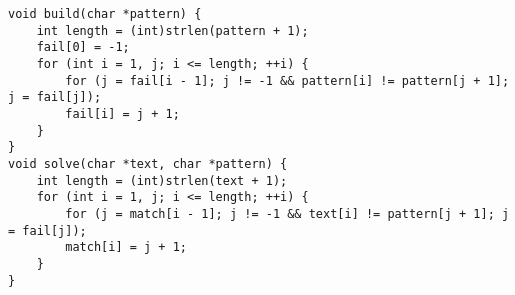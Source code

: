 \begin{lstlisting}
void build(char *pattern) {
    int length = (int)strlen(pattern + 1);
    fail[0] = -1;
    for (int i = 1, j; i <= length; ++i) {
        for (j = fail[i - 1]; j != -1 && pattern[i] != pattern[j + 1]; j = fail[j]);
        fail[i] = j + 1;
    }
}
void solve(char *text, char *pattern) {
    int length = (int)strlen(text + 1);
    for (int i = 1, j; i <= length; ++i) {
        for (j = match[i - 1]; j != -1 && text[i] != pattern[j + 1]; j = fail[j]);
        match[i] = j + 1;
    }
}
\end{lstlisting}
